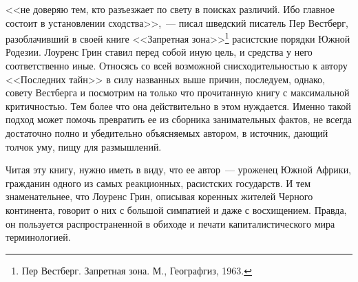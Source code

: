 \documentclass[12pt,a4paper,twoside,openany,svgnames]{memoir}
\begin{document}
<< не доверяю тем, кто разъезжает по свету в поисках различий. Ибо главное состоит в установлении сходства>>,~--- писал шведский писатель Пер Вестберг, разоблачивший в своей книге <<Запретная зона>>\footnote{Пер Вестберг. Запретная зона. М., Географгиз, 1963.} расистские порядки Южной Родезии. Лоуренс Грин ставил перед собой иную цель, и средства у него соответственно иные. Относясь со всей возможной снисходительностью к автору <<Последних тайн>> в силу названных выше причин, последуем, однако, совету Вестберга и посмотрим на только что прочитанную книгу с максимальной критичностью. Тем более что она действительно в этом нуждается. Именно такой подход может помочь превратить ее из сборника занимательных фактов, не всегда достаточно полно и убедительно объясняемых автором, в источник, дающий толчок уму, пищу для размышлений.

Читая эту книгу, нужно иметь в виду, что ее автор~--- уроженец Южной Африки, гражданин одного из самых реакционных, расистских государств. И тем знаменательнее, что Лоуренс Грин, описывая коренных жителей Черного континента, говорит о них с большой симпатией и даже с восхищением. Правда, он пользуется распространенной в обиходе и печати капиталистического мира терминологией.
\end{document}
